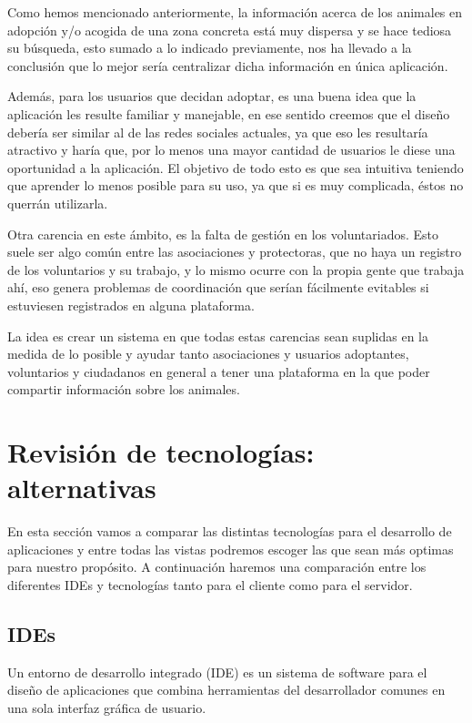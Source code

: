 Como hemos mencionado anteriormente, la información acerca de los animales en adopción y/o acogida de una zona concreta está muy dispersa y se hace tediosa su búsqueda, esto sumado a lo indicado previamente, nos ha llevado a la conclusión que lo mejor sería centralizar dicha información en única aplicación.

Además, para los usuarios que decidan adoptar, es una buena idea que la aplicación les resulte familiar y manejable, en ese sentido creemos que el diseño debería ser similar al de las redes sociales actuales, ya que eso les resultaría atractivo y haría que, por lo menos una mayor cantidad de usuarios le diese una oportunidad a la aplicación. El objetivo de todo esto es que sea intuitiva teniendo que aprender lo menos posible para su uso, ya que si es muy complicada, éstos no querrán utilizarla.

Otra carencia en este ámbito, es la falta de gestión en los voluntariados. Esto suele ser algo común entre las asociaciones y protectoras, que no haya un registro de los voluntarios y su trabajo, y lo mismo ocurre con la propia gente que trabaja ahí, eso genera problemas de coordinación que serían fácilmente evitables si estuviesen registrados en alguna plataforma.

La idea es crear un sistema en que todas estas carencias sean suplidas en la medida de lo posible y ayudar tanto asociaciones y usuarios adoptantes, voluntarios y ciudadanos en general a tener una plataforma en la que poder compartir información sobre los animales.




\section{Revisión de tecnologías: alternativas} \label{rev}
En esta sección vamos a comparar las distintas tecnologías para el desarrollo de aplicaciones y entre todas las vistas podremos escoger las que sean más optimas para nuestro propósito. A continuación haremos una comparación entre los diferentes IDEs y tecnologías tanto para el cliente como para el servidor.

\subsection{IDEs}
Un entorno de desarrollo integrado (IDE) \cite{ide} es un sistema de software para el diseño de aplicaciones que combina herramientas del desarrollador comunes en una sola interfaz gráfica de usuario.

